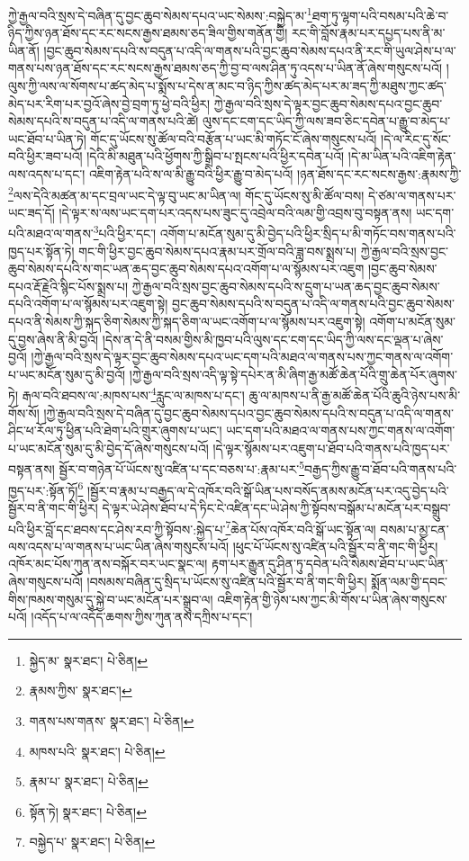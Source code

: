 ཀྱེ་རྒྱལ་བའི་སྲས་དེ་བཞིན་དུ་བྱང་ཆུབ་སེམས་དཔའ་ཡང་སེམས་:བསྐྱེད་མ་\footnote{སྐྱེད་མ་  སྣར་ཐང་།  པེ་ཅིན། }ཐག་ཏུ་ལྷག་པའི་བསམ་པའི་ཆེ་བ་ཉིད་ཀྱིས་ཉན་ཐོས་དང་རང་སངས་རྒྱས་ཐམས་ཅད་ཟིལ་གྱིས་གནོན་གྱི། རང་གི་བློས་རྣམ་པར་དཔྱད་པས་ནི་མ་ཡིན་ནོ། །བྱང་ཆུབ་སེམས་དཔའི་ས་བདུན་པ་འདི་ལ་གནས་པའི་བྱང་ཆུབ་སེམས་དཔའ་ནི་རང་གི་ཡུལ་ཤེས་པ་ལ་གནས་པས་ཉན་ཐོས་དང་རང་སངས་རྒྱས་ཐམས་ཅད་ཀྱི་བྱ་བ་ལས་ཤིན་ཏུ་འདས་པ་ཡིན་ནོ་ཞེས་གསུངས་པའོ། །ལུས་ཀྱི་ལས་ལ་སོགས་པ་ཚད་མེད་པ་སྨོས་པ་དེས་ན་མང་བ་ཉིད་ཀྱིས་ཚད་མེད་པར་མ་ཟད་ཀྱི་མཐུས་ཀྱང་ཚད་མེད་པར་རིག་པར་བྱའོ་ཞེས་བྱེ་བྲག་ཏུ་ཕྱེ་བའི་ཕྱིར། ཀྱེ་རྒྱལ་བའི་སྲས་དེ་ལྟར་བྱང་ཆུབ་སེམས་དཔའ་བྱང་ཆུབ་སེམས་དཔའི་ས་བདུན་པ་འདི་ལ་གནས་པའི་ཚེ། ལུས་དང་ངག་དང་ཡིད་ཀྱི་ལས་ཟབ་ཅིང་དབེན་པ་རྒྱུ་བ་མེད་པ་ཡང་ཐོབ་པ་ཡིན་ཏེ། གོང་དུ་ཡོངས་སུ་ཚོལ་བའི་བརྩོན་པ་ཡང་མི་གཏོང་ངོ་ཞེས་གསུངས་པའོ། །དེ་ལ་རིང་དུ་སོང་བའི་ཕྱིར་ཟབ་པའོ། །དེའི་མི་མཐུན་པའི་ཕྱོགས་ཀྱི་སྒྲིབ་པ་སྤངས་པའི་ཕྱིར་དབེན་པའོ། །དེ་མ་ཡིན་པའི་འཇིག་རྟེན་ལས་འདས་པ་དང་། འཇིག་རྟེན་པའི་ས་ལ་མི་རྒྱུ་བའི་ཕྱིར་རྒྱུ་བ་མེད་པའོ། །ཉན་ཐོས་དང་རང་སངས་རྒྱས་:རྣམས་ཀྱི་\footnote{རྣམས་ཀྱིས་  སྣར་ཐང་། }ལས་དེའི་མཚན་མ་དང་བྲལ་ཡང་དེ་ལྟ་བུ་ཡང་མ་ཡིན་ལ། གོང་དུ་ཡོངས་སུ་མི་ཚོལ་བས། དེ་ཙམ་ལ་གནས་པར་ཡང་ཟད་དོ། །དེ་ལྟར་ས་ལས་ཡང་དག་པར་འདས་པས་ཟུང་དུ་འབྲེལ་བའི་ལམ་གྱི་འབྲས་བུ་བསྟན་ནས། ཡང་དག་པའི་མཐའ་ལ་གནས་\footnote{གནས་པས་གནས་  སྣར་ཐང་།  པེ་ཅིན། }པའི་ཕྱིར་དང་། འགོག་པ་མངོན་སུམ་དུ་མི་བྱེད་པའི་ཕྱིར་སྲིད་པ་མི་གཏོང་བས་གནས་པའི་ཁྱད་པར་སྟོན་ཏེ། གང་གི་ཕྱིར་བྱང་ཆུབ་སེམས་དཔའ་རྣམ་པར་གྲོལ་བའི་ཟླ་བས་སྨྲས་པ། ཀྱེ་རྒྱལ་བའི་སྲས་བྱང་ཆུབ་སེམས་དཔའི་ས་གང་ཡན་ཆད་བྱང་ཆུབ་སེམས་དཔའ་འགོག་པ་ལ་སྙོམས་པར་འཇུག །བྱང་ཆུབ་སེམས་དཔའ་རྡོ་རྗེའི་སྙིང་པོས་སྨྲས་པ། ཀྱེ་རྒྱལ་བའི་སྲས་བྱང་ཆུབ་སེམས་དཔའི་ས་དྲུག་པ་ཡན་ཆད་བྱང་ཆུབ་སེམས་དཔའི་འགོག་པ་ལ་སྙོམས་པར་འཇུག་སྟེ། བྱང་ཆུབ་སེམས་དཔའི་ས་བདུན་པ་འདི་ལ་གནས་པའི་བྱང་ཆུབ་སེམས་དཔའ་ནི་སེམས་ཀྱི་སྐད་ཅིག་སེམས་ཀྱི་སྐད་ཅིག་ལ་ཡང་འགོག་པ་ལ་སྙོམས་པར་འཇུག་སྟེ། འགོག་པ་མངོན་སུམ་དུ་བྱས་ཞེས་ནི་མི་བྱའོ། །དེས་ན་དེ་ནི་བསམ་གྱིས་མི་ཁྱབ་པའི་ལུས་དང་ངག་དང་ཡིད་ཀྱི་ལས་དང་ལྡན་པ་ཞེས་བྱའོ། །ཀྱེ་རྒྱལ་བའི་སྲས་དེ་ལྟར་བྱང་ཆུབ་སེམས་དཔའ་ཡང་དག་པའི་མཐའ་ལ་གནས་པས་ཀྱང་གནས་ལ་འགོག་པ་ཡང་མངོན་སུམ་དུ་མི་བྱའོ། །ཀྱེ་རྒྱལ་བའི་སྲས་འདི་ལྟ་སྟེ་དཔེར་ན་མི་ཞིག་རྒྱ་མཚོ་ཆེན་པོའི་གྲུ་ཆེན་པོར་ཞུགས་ཏེ། རྒལ་བའི་ཐབས་ལ་:མཁས་པས་\footnote{མཁས་པའི་  སྣར་ཐང་།  པེ་ཅིན། }རླུང་ལ་མཁས་པ་དང་། ཆུ་ལ་མཁས་པ་ནི་རྒྱ་མཚོ་ཆེན་པོའི་ཆུའི་ཉེས་པས་མི་གོས་སོ། །ཀྱེ་རྒྱལ་བའི་སྲས་དེ་བཞིན་དུ་བྱང་ཆུབ་སེམས་དཔའ་བྱང་ཆུབ་སེམས་དཔའི་ས་བདུན་པ་འདི་ལ་གནས་ཤིང་ཕ་རོལ་ཏུ་ཕྱིན་པའི་ཐེག་པའི་གྲུར་ཞུགས་པ་ཡང་། ཡང་དག་པའི་མཐའ་ལ་གནས་པས་ཀྱང་གནས་ལ་འགོག་པ་ཡང་མངོན་སུམ་དུ་མི་བྱེད་དོ་ཞེས་གསུངས་པའོ། །དེ་ལྟར་སྙོམས་པར་འཇུག་པ་ཐོབ་པའི་གནས་པའི་ཁྱད་པར་བསྟན་ནས། སྦྱོར་བ་གཉེན་པོ་ཡོངས་སུ་འཛིན་པ་དང་བཅས་པ་:རྣམ་པར་\footnote{རྣམ་པ་  སྣར་ཐང་།  པེ་ཅིན། }བརྒྱད་ཀྱིས་རྒྱུ་བ་ཐོབ་པའི་གནས་པའི་ཁྱད་པར་:སྟོན་ཏོ།\footnote{སྟོན་ཏེ།  སྣར་ཐང་།  པེ་ཅིན། } །སྦྱོར་བ་རྣམ་པ་བརྒྱད་ལ་དེ་འཁོར་བའི་སྒོ་ཡིན་པས་བསོད་ནམས་མངོན་པར་འདུ་བྱེད་པའི་སྦྱོར་བ་ནི་གང་གི་ཕྱིར། དེ་ལྟར་ཡེ་ཤེས་ཐོབ་པ་དེ་ཏིང་ངེ་འཛིན་དང་ཡེ་ཤེས་ཀྱི་སྟོབས་བསྒོམ་པ་མངོན་པར་བསྒྲུབ་པའི་ཕྱིར་བློ་དང་ཐབས་དང་ཤེས་རབ་ཀྱི་སྟོབས་:སྐྱེད་པ་\footnote{བསྐྱེད་པ་  སྣར་ཐང་།  པེ་ཅིན། }ཆེན་པོས་འཁོར་བའི་སྒོ་ཡང་སྟོན་ལ། བསམ་པ་མྱ་ངན་ལས་འདས་པ་ལ་གནས་པ་ཡང་ཡིན་ཞེས་གསུངས་པའོ། །ཕུང་པོ་ཡོངས་སུ་འཛིན་པའི་སྦྱོར་བ་ནི་གང་གི་ཕྱིར། འཁོར་མང་པོས་ཀུན་ནས་བསྐོར་བར་ཡང་སྣང་ལ། རྟག་པར་རྒྱུན་དུ་ཤིན་ཏུ་དབེན་པའི་སེམས་ཐོབ་པ་ཡང་ཡིན་ཞེས་གསུངས་པའོ། །བསམས་བཞིན་དུ་སྲིད་པ་ཡོངས་སུ་འཛིན་པའི་སྦྱོར་བ་ནི་གང་གི་ཕྱིར། སྨོན་ལམ་གྱི་དབང་གིས་ཁམས་གསུམ་དུ་སྐྱེ་བ་ཡང་མངོན་པར་སྒྲུབ་ལ། འཇིག་རྟེན་གྱི་ཉེས་པས་ཀྱང་མི་གོས་པ་ཡིན་ཞེས་གསུངས་པའོ། །འདོད་པ་ལ་འདོད་ཆགས་ཀྱིས་ཀུན་ནས་དཀྲིས་པ་དང་། 
